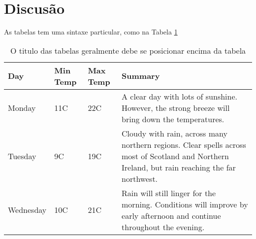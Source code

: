 \section{Discusão}

As tabelas tem uma sintaxe particular, como na Tabela \ref{tab:tabelaExemplos}

\begin{table}
\begin{center}
\caption{O titulo das tabelas geralmente debe se posicionar encima da tabela} \label{tab:tabelaExemplos}
    \begin{tabular}{ | l | l | l | p{5cm} |}
    \hline
    Day & Min Temp & Max Temp & Summary \\ \hline
    Monday & 11C & 22C & A clear day with lots of sunshine.  
    However, the strong breeze will bring down the temperatures. \\ \hline
    Tuesday & 9C & 19C & Cloudy with rain, across many northern regions. Clear spells 
    across most of Scotland and Northern Ireland, 
    but rain reaching the far northwest. \\ \hline
    Wednesday & 10C & 21C & Rain will still linger for the morning. 
    Conditions will improve by early afternoon and continue 
    throughout the evening. \\
    \hline
    \end{tabular}
\end{center}
\end{table}

